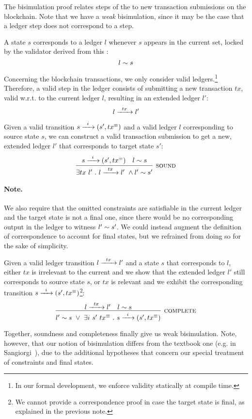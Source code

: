 The bisimulation proof relates steps of the \CEM{} to new transaction
submissions on the blockchain.  Note that we have a \textit{weak}
bisimulation, since it may be the case that a ledger step does not
correspond to a \CEM{} step.

\begin{definition}
A \CEM{} state $s$ corresponds to a ledger $l$ whenever $s$ appears
in the current \UTXO{} set,
locked by the validator derived from this \CEM{}:
\[
 l \sim s 
\]
\end{definition}

\begin{definition}
Concerning the blockchain transactions, we only consider valid
ledgers.\footnote{ In our formal development, we enforce validity
  statically at compile time.  }  Therefore, a valid step in the
ledger consists of submitting a new transaction $tx$,
valid w.r.t. to the current ledger $l$,
resulting in an extended ledger $l'$:
\[
 l \xrightarrow{\hspace{5pt} tx \hspace{5pt}} l' 
\]
\end{definition}

\begin{proposition}[Soundness]
Given a valid \CEM{} transition $ s \xrightarrow{\hspace{5pt} i \hspace{5pt}} (s' , tx^\equiv) $ and a valid ledger
$l$ corresponding to source state $s$, we can construct a valid
transaction submission to get a new, extended ledger $l'$ that
corresponds to target state $s'$:
\[
\infer[\textsc{sound}]
  {\exists tx\ l'\ .\ \LStep{l}{tx}\ \wedge \Sim{l'}{s'}}
  {%
    \CStep{s}{i}{\txeq}
  & \Sim{l}{s}
  }
\]
\end{proposition}

\paragraph{Note.}
We also require that the omitted constraints are satisfiable in the
current ledger and the target state is not a final one, since there
would be no corresponding output in the ledger to witness
$ l' \sim s' $.  We could instead augment the definition of
correspondence to account for final states, but we refrained from
doing so for the sake of simplicity.

\begin{proposition}[Completeness]
Given a valid ledger transition $ l \xrightarrow{\hspace{5pt} tx \hspace{5pt}} l' $ and a \CEM{} state $s$
that corresponds to $l$, either $tx$ is irrelevant to the current \CEM{}
and we show that the extended ledger $l'$ still corresponds to source
state $s$, or $tx$ is relevant and we exhibit the corresponding \CEM{}
transition $ s \xrightarrow{\hspace{5pt} i \hspace{5pt}} (s' , tx^\equiv) $\footnote{ We cannot provide a
  correspondence proof in case the target state is final, as explained
  in the previous note.  }:
\[
\infer[\textsc{complete}]
  { \Sim{l'}{s}\ \vee\ \exists i\ s'\ \txeq\ .\ \CStep{s}{i}{\txeq} }
  { \LStep{l}{tx}
  & \Sim{l}{s}
  }
\]
\end{proposition}

Together, soundness and completeness finally give us weak bisimulation.
Note, however, that our notion of bisimulation differs from the textbook one (e.g. in Sangiorgi~\cite{sangiorgi}),
due to the additional hypotheses that concern our special treatment of constraints and final states.
